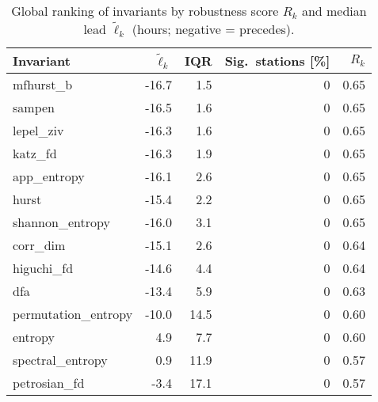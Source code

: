 
\begin{table}[t]
\centering
\small
\caption{Global ranking of invariants by robustness score $R_k$ and median lead $\widetilde{\ell}_k$ (hours; negative = precedes).}
\label{tab:rank_global}
\begin{tabular}{@{}l r r r r@{}}
\toprule
\textbf{Invariant} & $\widetilde{\ell}_k$ & IQR & Sig.\ stations [\%] & $R_k$ \\
\midrule
mfhurst\_b & -16.7 & 1.5 & 0 & 0.65 \\
sampen & -16.5 & 1.6 & 0 & 0.65 \\
lepel\_ziv & -16.3 & 1.6 & 0 & 0.65 \\
katz\_fd & -16.3 & 1.9 & 0 & 0.65 \\
app\_entropy & -16.1 & 2.6 & 0 & 0.65 \\
hurst & -15.4 & 2.2 & 0 & 0.65 \\
shannon\_entropy & -16.0 & 3.1 & 0 & 0.65 \\
corr\_dim & -15.1 & 2.6 & 0 & 0.64 \\
higuchi\_fd & -14.6 & 4.4 & 0 & 0.64 \\
dfa & -13.4 & 5.9 & 0 & 0.63 \\
permutation\_entropy & -10.0 & 14.5 & 0 & 0.60 \\
entropy & 4.9 & 7.7 & 0 & 0.60 \\
spectral\_entropy & 0.9 & 11.9 & 0 & 0.57 \\
petrosian\_fd & -3.4 & 17.1 & 0 & 0.57 \\
\bottomrule
\end{tabular}
\end{table}
